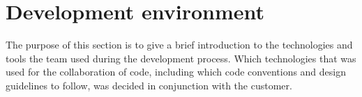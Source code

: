 \newpage
\section{Development environment}
The purpose of this section is to give a brief introduction to the technologies and tools the team used during the development process. Which technologies that was used for the collaboration of code, including which code conventions and design guidelines to follow, was decided in conjunction with the customer.







